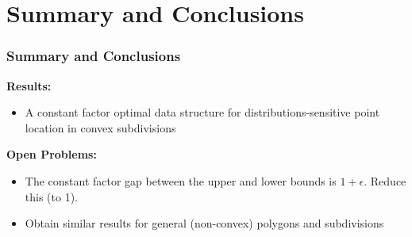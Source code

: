 \documentclass{beamer}
\begin{document}
\section{Summary and Conclusions}
\frame
{
	\frametitle{Summary and Conclusions}
	\textbf{Results:}
	\begin{itemize}
	\item<2-> A constant factor optimal data structure for
distributions-sensitive point location in convex subdivisions
	\end{itemize}
	\textbf{Open Problems:}
	\begin{itemize}
	\item<3-> The constant factor gap between the upper and lower
bounds is $1+\epsilon$.  Reduce this (to 1). 
	\item<4-> Obtain similar results for general (non-convex)
polygons and subdivisions
	\end{itemize}
}
\end{document}
